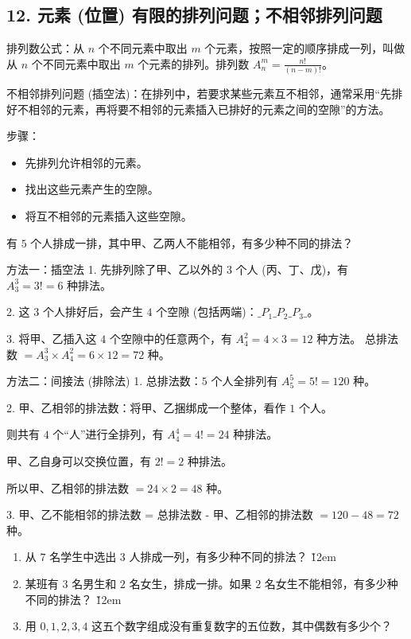 \subsection*{12. 元素 (位置) 有限的排列问题；不相邻排列问题}

\begin{theorem}
    排列数公式：从 $n$ 个不同元素中取出 $m$ 个元素，按照一定的顺序排成一列，叫做从 $n$ 个不同元素中取出 $m$ 个元素的排列。排列数 $A_n^m = \frac{n!}{(n-m)!}$。

    不相邻排列问题 (插空法)：在排列中，若要求某些元素互不相邻，通常采用“先排好不相邻的元素，再将要不相邻的元素插入已排好的元素之间的空隙”的方法。

    步骤：
    \begin{itemize}
        \item 先排列允许相邻的元素。
        \item 找出这些元素产生的空隙。
        \item 将互不相邻的元素插入这些空隙。
    \end{itemize}
\end{theorem}

\begin{example}
    有 $5$ 个人排成一排，其中甲、乙两人不能相邻，有多少种不同的排法？
\end{example}
\begin{solution}
    方法一：插空法
    1.  先排列除了甲、乙以外的 $3$ 个人 (丙、丁、戊)，有 $A_3^3 = 3! = 6$ 种排法。

    2.  这 $3$ 个人排好后，会产生 $4$ 个空隙 (包括两端)：$\_ P_1 \_ P_2 \_ P_3 \_$。

    3.  将甲、乙插入这 $4$ 个空隙中的任意两个，有 $A_4^2 = 4 \times 3 = 12$ 种方法。
    总排法数 $= A_3^3 \times A_4^2 = 6 \times 12 = 72$ 种。

    方法二：间接法 (排除法)
    1.  总排法数：$5$ 个人全排列有 $A_5^5 = 5! = 120$ 种。

    2.  甲、乙相邻的排法数：将甲、乙捆绑成一个整体，看作 $1$ 个人。

    则共有 $4$ 个“人”进行全排列，有 $A_4^4 = 4! = 24$ 种排法。

    甲、乙自身可以交换位置，有 $2! = 2$ 种排法。

    所以甲、乙相邻的排法数 $= 24 \times 2 = 48$ 种。

    3.  甲、乙不能相邻的排法数 = 总排法数 - 甲、乙相邻的排法数 $= 120 - 48 = 72$ 种。
\end{solution}

\begin{problem}
\begin{enumerate}
    \item 从 $7$ 名学生中选出 $3$ 人排成一列，有多少种不同的排法？
          \v{12em}
    \item 某班有 $3$ 名男生和 $2$ 名女生，排成一排。如果 $2$ 名女生不能相邻，有多少种不同的排法？
          \v{12em}
    \item 用 $0, 1, 2, 3, 4$ 这五个数字组成没有重复数字的五位数，其中偶数有多少个？
\end{enumerate}
\end{problem}

